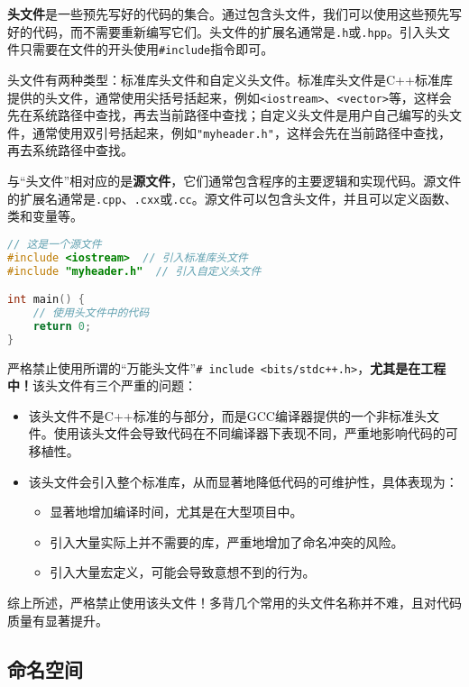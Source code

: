 \textbf{头文件}是一些预先写好的代码的集合。通过包含头文件，我们可以使用这些预先写好的代码，而不需要重新编写它们。头文件的扩展名通常是\texttt{.h}或\texttt{.hpp}。引入头文件只需要在文件的开头使用\texttt{\#include}指令即可。

头文件有两种类型：标准库头文件和自定义头文件。标准库头文件是C++标准库提供的头文件，通常使用尖括号括起来，例如\texttt{<iostream>}、\texttt{<vector>}等，这样会先在系统路径中查找，再去当前路径中查找；自定义头文件是用户自己编写的头文件，通常使用双引号括起来，例如\texttt{"myheader.h"}，这样会先在当前路径中查找，再去系统路径中查找。

与“头文件”相对应的是\textbf{源文件}，它们通常包含程序的主要逻辑和实现代码。源文件的扩展名通常是\texttt{.cpp}、\texttt{.cxx}或\texttt{.cc}。源文件可以包含头文件，并且可以定义函数、类和变量等。

\begin{lstlisting}[language=C++]
// 这是一个源文件
#include <iostream>  // 引入标准库头文件
#include "myheader.h"  // 引入自定义头文件

int main() {
    // 使用头文件中的代码
    return 0;
}
\end{lstlisting}

\begin{warning}
    严格禁止使用所谓的“万能头文件”\texttt{\# include <bits/stdc++.h>}，\textbf{尤其是在工程中！}该头文件有三个严重的问题：
    \begin{itemize}
        \item 该头文件不是C++标准的与部分，而是GCC编译器提供的一个非标准头文件。使用该头文件会导致代码在不同编译器下表现不同，严重地影响代码的可移植性。
        \item 该头文件会引入整个标准库，从而显著地降低代码的可维护性，具体表现为：
        \begin{itemize}
            \item 显著地增加编译时间，尤其是在大型项目中。
            \item 引入大量实际上并不需要的库，严重地增加了命名冲突的风险。
            \item 引入大量宏定义，可能会导致意想不到的行为。
        \end{itemize}
    \end{itemize}
    综上所述，严格禁止使用该头文件！多背几个常用的头文件名称并不难，且对代码质量有显著提升。
\end{warning}

\subsection{命名空间}

